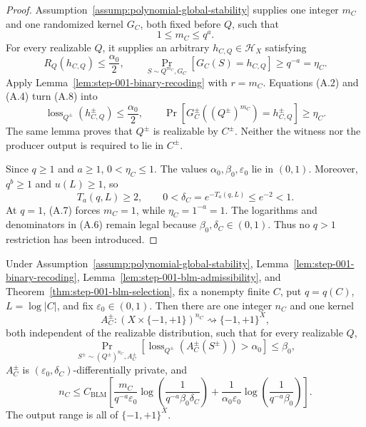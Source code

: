 \begin{proof}
Assumption~\ref{assump:polynomial-global-stability} supplies one
integer \(m_C\) and one randomized kernel \(G_C\), both fixed before
\(Q\), such that
\[
1\leq m_C\leq q^a.
\tag{A.7}
\]
For every realizable \(Q\), it supplies an arbitrary
\(h_{C,Q}\in\mathcal H_X\) satisfying
\[
R_Q(h_{C,Q})\leq\frac{\alpha_0}{2},
\qquad
\Pr_{S\sim Q^{m_C},G_C}[G_C(S)=h_{C,Q}]
\geq q^{-a}=\eta_C.
\tag{A.8}
\]
Apply Lemma~\ref{lem:step-001-binary-recoding} with \(r=m_C\).
Equations (A.2) and (A.4) turn (A.8) into
\[
\operatorname{loss}_{Q^\pm}(h_{C,Q}^\pm)
\leq\frac{\alpha_0}{2},
\qquad
\Pr[G_C^\pm((Q^\pm)^{m_C})=h_{C,Q}^\pm]
\geq\eta_C.
\tag{A.9}
\]
The same lemma proves that \(Q^\pm\) is realizable by \(C^\pm\).
Neither the witness nor the producer output is required to lie in
\(C^\pm\).

Since \(q\geq1\) and \(a\geq1\), \(0<\eta_C\leq1\).
The values \(\alpha_0,\beta_0,\varepsilon_0\) lie in \((0,1)\).
Moreover, \(q^b\geq1\) and \(u(L)\geq1\), so
\[
T_a(q,L)\geq2,\qquad
0<\delta_C=e^{-T_a(q,L)}\leq e^{-2}<1.
\tag{A.10}
\]
At \(q=1\), (A.7) forces \(m_C=1\), while
\(\eta_C=1^{-a}=1\).  The logarithms and denominators in (A.6) remain
legal because \(\beta_0,\delta_C\in(0,1)\).  Thus no \(q>1\)
restriction has been introduced.
\end{proof}

\begin{proposition}
\label{prop:step-001-uniform-blm}
Under Assumption~\ref{assump:polynomial-global-stability},
Lemma~\ref{lem:step-001-binary-recoding},
Lemma~\ref{lem:step-001-blm-admissibility}, and
Theorem~\ref{thm:step-001-blm-selection}, fix a nonempty finite \(C\),
put \(q=q(C)\), \(L=\log|C|\), and fix
\(\varepsilon_0\in(0,1)\).  Then there are one integer \(n_C\) and one
kernel
\[
A_C^\pm:(X\times\{-1,+1\})^{n_C}
\rightsquigarrow\{-1,+1\}^X,
\]
both independent of the realizable distribution, such that for every
realizable \(Q\),
\[
\Pr_{S^\pm\sim(Q^\pm)^{n_C},A_C^\pm}
\!\left[
\operatorname{loss}_{Q^\pm}(A_C^\pm(S^\pm))>\alpha_0
\right]\leq\beta_0,
\tag{A.11}
\]
\(A_C^\pm\) is \((\varepsilon_0,\delta_C)\)-differentially private,
and
\[
n_C\leq C_{\mathrm{BLM}}
\left[
\frac{m_C}{q^{-a}\varepsilon_0}
\log\!\left(\frac1{q^{-a}\beta_0\delta_C}\right)
+
\frac1{\alpha_0\varepsilon_0}
\log\!\left(\frac1{q^{-a}\beta_0}\right)
\right].
\tag{A.12}
\]
The output range is all of \(\{-1,+1\}^X\).
\end{proposition}

